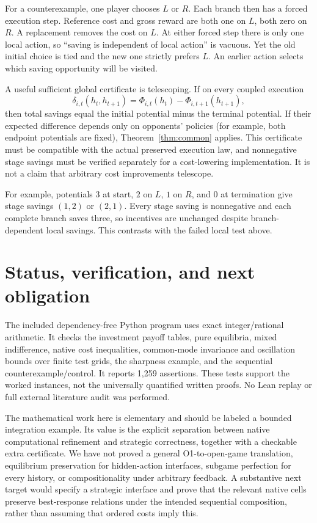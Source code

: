\documentclass[11pt]{article}
\begin{document}
For a counterexample, one player chooses \(L\) or \(R\). Each branch then has a forced execution step. Reference cost and gross reward are both one on \(L\), both zero on \(R\). A replacement removes the cost on \(L\). At either forced step there is only one local action, so ``saving is independent of local action'' is vacuous. Yet the old initial choice is tied and the new one strictly prefers \(L\). An earlier action selects which saving opportunity will be visited.

A useful sufficient global certificate is telescoping. If on every coupled execution
\[
 \delta_{i,t}(h_t,h_{t+1})=\Phi_{i,t}(h_t)-\Phi_{i,t+1}(h_{t+1}),
\]
then total savings equal the initial potential minus the terminal potential. If their expected difference depends only on opponents' policies (for example, both endpoint potentials are fixed), Theorem~\ref{thm:common} applies. This certificate must be compatible with the actual preserved execution law, and nonnegative stage savings must be verified separately for a cost-lowering implementation. It is not a claim that arbitrary cost improvements telescope.

For example, potentials \(3\) at start, \(2\) on \(L\), \(1\) on \(R\), and \(0\) at termination give stage savings \((1,2)\) or \((2,1)\). Every stage saving is nonnegative and each complete branch saves three, so incentives are unchanged despite branch-dependent local savings. This contrasts with the failed local test above.

\section{Status, verification, and next obligation}
The included dependency-free Python program uses exact integer/rational arithmetic. It checks the investment payoff tables, pure equilibria, mixed indifference, native cost inequalities, common-mode invariance and oscillation bounds over finite test grids, the sharpness example, and the sequential counterexample/control. It reports 1,259 assertions. These tests support the worked instances, not the universally quantified written proofs. No Lean replay or full external literature audit was performed.

The mathematical work here is elementary and should be labeled a bounded integration example. Its value is the explicit separation between native computational refinement and strategic correctness, together with a checkable extra certificate. We have not proved a general O1-to-open-game translation, equilibrium preservation for hidden-action interfaces, subgame perfection for every history, or compositionality under arbitrary feedback. A substantive next target would specify a strategic interface and prove that the relevant native cells preserve best-response relations under the intended sequential composition, rather than assuming that ordered costs imply this.
\end{document}
